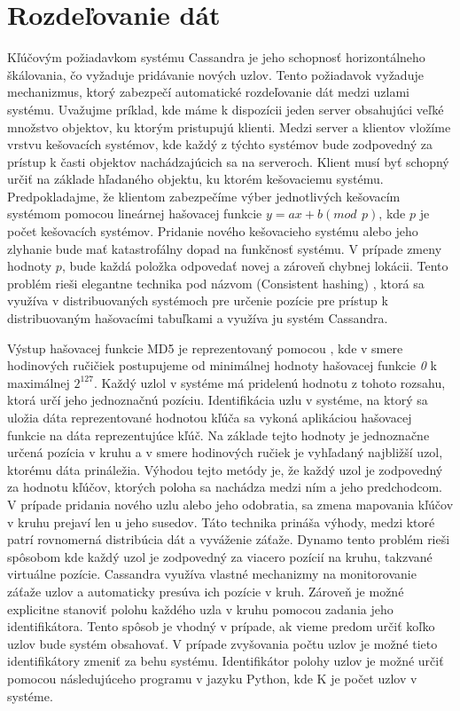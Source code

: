 \documentclass[11pt,twoside,a4paper]{book}
\begin{document}
\section{Rozdeľovanie dát}
Kľúčovým požiadavkom systému Cassandra je jeho schopnosť horizontálneho škálovania, čo vyžaduje pridávanie nových uzlov. Tento požiadavok vyžaduje mechanizmus, ktorý zabezpečí automatické rozdeľovanie dát medzi uzlami systému. Uvažujme príklad, kde máme k dispozícii jeden server obsahujúci veľké množstvo objektov, ku ktorým pristupujú klienti. Medzi server a klientov vložíme vrstvu kešovacích systémov, kde každý z týchto systémov bude zodpovedný za prístup k časti objektov nachádzajúcich sa na serveroch. Klient musí byť schopný určiť na základe hľadaného objektu, ku ktorém kešovaciemu systému. Predpokladajme, že klientom zabezpečíme výber jednotlivých kešovacím systémom pomocou lineárnej hašovacej funkcie ${y = ax + b (mod\,\ p)}$, kde $p$ je počet kešovacích systémov. Pridanie nového kešovacieho systému alebo jeho zlyhanie bude mať katastrofálny dopad na funkčnosť systému. V prípade zmeny hodnoty $p$, bude každá položka odpovedať novej a zároveň chybnej lokácii. Tento problém rieši elegantne technika pod názvom \emph{} (Consistent hashing) \cite{Karger:1997:CHR:258533.258660}, ktorá sa využíva v distribuovaných systémoch pre určenie pozície pre prístup k distribuovaným hašovacími tabuľkami a využíva ju systém Cassandra.

Výstup hašovacej funkcie MD5 je reprezentovaný pomocou , kde v smere hodinových ručičiek postupujeme od minimálnej hodnoty hašovacej funkcie \textit{0} k maximálnej ${2^{127}}$. Každý uzlol v systéme má pridelenú hodnotu z tohoto rozsahu, ktorá určí jeho jednoznačnú pozíciu. Identifikácia uzlu v systéme, na ktorý sa uložia dáta reprezentované hodnotou kľúča sa vykoná aplikáciou hašovacej funkcie na dáta reprezentujúce kľúč. Na základe tejto hodnoty je jednoznačne určená pozícia v kruhu a v smere hodinových ručiek je vyhľadaný najbližší uzol, ktorému dáta prináležia. Výhodou tejto metódy je, že každý uzol je zodpovedný za hodnotu kľúčov, ktorých poloha sa nachádza medzi ním a jeho predchodcom. V prípade pridania nového uzlu alebo jeho odobratia, sa zmena mapovania kľúčov v kruhu prejaví len u jeho susedov. Táto technika prináša výhody, medzi ktoré patrí rovnomerná distribúcia dát a vyváženie záťaže. Dynamo tento problém rieši spôsobom kde každý uzol je zodpovedný za viacero pozícií na kruhu, takzvané virtuálne pozície. Cassandra využíva vlastné mechanizmy na monitorovanie záťaže uzlov a automaticky presúva ich pozície v kruh. Zároveň je možné explicitne stanoviť polohu každého uzla v kruhu pomocou zadania jeho identifikátora. Tento spôsob je vhodný v prípade, ak vieme predom určiť koľko uzlov bude systém obsahovať. V prípade zvyšovania počtu uzlov je možné tieto identifikátory zmeniť za behu systému. Identifikátor polohy uzlov je možné určiť pomocou následujúceho programu v jazyku Python, kde K je počet uzlov v systéme.
\end{document}
